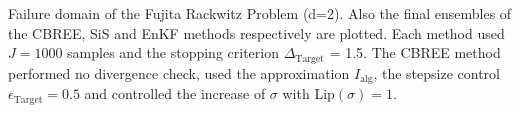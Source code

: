 Failure domain of the Fujita Rackwitz Problem (d=2). Also the final ensembles of the CBREE, SiS and EnKF methods respectively are plotted. Each method used $J=1000$ samples and the stopping criterion $\Delta_{\text{Target}}$ = 1.5. The CBREE method performed no divergence check, used the approximation $I_\text{alg}$, the stepsize control $\epsilon_{\text{Target}}=0.5$ and controlled the increase of $\sigma$ with $\text{Lip}(\sigma) = 1$.